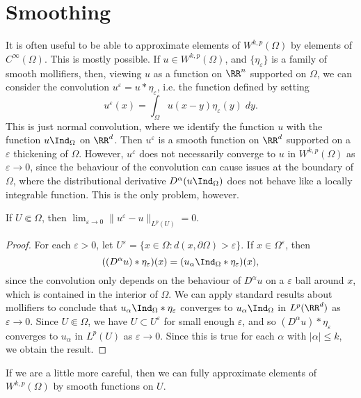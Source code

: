 \section{Smoothing}

It is often useful to be able to approximate elements of $W^{k,p}(\Omega)$ by elements of $C^\infty(\Omega)$. This is mostly possible. If $u \in W^{k,p}(\Omega)$, and $\{ \eta_\varepsilon \}$ is a family of smooth mollifiers, then, viewing $u$ as a function on $\RR^n$ supported on $\Omega$, we can consider the convolution $u^\varepsilon = u * \eta_\varepsilon$, i.e. the function defined by setting
%
\[ u^\varepsilon(x) = \int_\Omega u(x - y) \eta_\varepsilon(y)\; dy. \]
%
This is just normal convolution, where we identify the function $u$ with the function $u \Ind_\Omega$ on $\RR^d$. Then $u^\varepsilon$ is a smooth function on $\RR^d$ supported on a $\varepsilon$ thickening of $\Omega$. However, $u^\varepsilon$ does not necessarily converge to $u$ in $W^{k,p}(\Omega)$ as $\varepsilon \to 0$, since the behaviour of the convolution can cause issues at the boundary of $\Omega$, where the distributional derivative $D^\alpha(u \Ind_\Omega)$ does not behave like a locally integrable function. This is the only problem, however.

\begin{theorem}
  If $U \Subset \Omega$, then $\lim_{\varepsilon \to 0} \| u^\varepsilon - u \|_{L^p(U)} = 0$.
\end{theorem}
\begin{proof}
  For each $\varepsilon > 0$, let $U^\varepsilon = \{ x \in \Omega: d(x,\partial \Omega) > \varepsilon \}$. If $x \in \Omega^\varepsilon$, then
  \[ ((D^\alpha u) * \eta_\varepsilon)(x) = (u_\alpha \Ind_\Omega * \eta_\varepsilon)(x), \]
  since the convolution only depends on the behaviour of $D^\alpha u$ on a $\varepsilon$ ball around $x$, which is contained in the interior of $\Omega$. We can apply standard results about mollifiers to conclude that $u_\alpha \Ind_\Omega * \eta_\varepsilon$ converges to $u_\alpha \Ind_\Omega$ in $L^p(\RR^d)$ as $\varepsilon \to 0$. Since $U \Subset \Omega$, we have $U \subset U^\varepsilon$ for small enough $\varepsilon$, and so $(D^\alpha u) * \eta_\varepsilon$ converges to $u_\alpha$ in $L^p(U)$ as $\varepsilon \to 0$. Since this is true for each $\alpha$ with $|\alpha| \leq k$, we obtain the result.
\end{proof}

If we are a little more careful, then we can fully approximate elements of $W^{k,p}(\Omega)$ by smooth functions on $U$.

